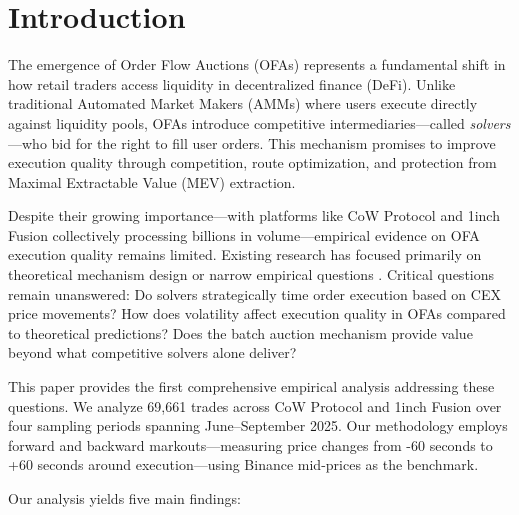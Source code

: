 \documentclass[12pt,a4paper]{article}
\begin{document}
\newpage
\tableofcontents
\newpage

\section{Introduction}

The emergence of Order Flow Auctions (OFAs) represents a fundamental shift in how retail traders access liquidity in decentralized finance (DeFi). Unlike traditional Automated Market Makers (AMMs) where users execute directly against liquidity pools, OFAs introduce competitive intermediaries---called \textit{solvers}---who bid for the right to fill user orders. This mechanism promises to improve execution quality through competition, route optimization, and protection from Maximal Extractable Value (MEV) extraction.

Despite their growing importance---with platforms like CoW Protocol and 1inch Fusion collectively processing billions in volume---empirical evidence on OFA execution quality remains limited. Existing research has focused primarily on theoretical mechanism design \citep{flashbots2023ofa1, flashbots2023ofa2} or narrow empirical questions \citep{bachu2024, yuminaga2025}. Critical questions remain unanswered: Do solvers strategically time order execution based on CEX price movements? How does volatility affect execution quality in OFAs compared to theoretical predictions? Does the batch auction mechanism provide value beyond what competitive solvers alone deliver?

This paper provides the first comprehensive empirical analysis addressing these questions. We analyze 69,661 trades across CoW Protocol and 1inch Fusion over four sampling periods spanning June--September 2025. Our methodology employs forward and backward markouts---measuring price changes from -60 seconds to +60 seconds around execution---using Binance mid-prices as the benchmark.

Our analysis yields five main findings:
\end{document}
